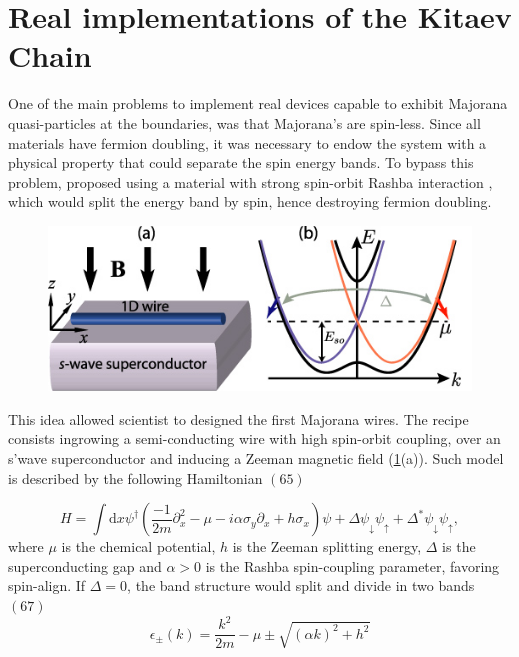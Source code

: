 % 
% 
\section{Real implementations of the Kitaev Chain \label{sec:exp}} 

 One of the main problems to implement real devices capable to exhibit Majorana quasi-particles at the boundaries, was that Majorana's are spin-less. Since all materials have fermion doubling,  it was necessary to endow the system with a physical property that could separate the spin energy bands. To bypass this problem, \citeauthor{lutchyn_majorana_2010}  proposed using a material with strong spin-orbit Rashba interaction \cite{manchon_new_2015}, which would split the energy band by spin, hence destroying fermion doubling. 

\begin{figure}[t]
\centering
\includegraphics[scale=0.7]{IMAGES/Majorana/Mwire.png}
\caption{ \label{fig:spin-orbit} \protect{}}
\end{figure}


This idea allowed scientist to designed the first Majorana wires. The recipe consists ingrowing a semi-conducting wire with high spin-orbit coupling, over an s'wave superconductor and inducing a Zeeman magnetic field (\ref{fig:spin-orbit}(a)). Such model is described by the following Hamiltonian \cite{alicea_new_2012}$(65)$

\begin{equation}
    H =\int\mbox{d}x\psi^{\dagger}\left(\frac{-1}{2m}\partial_x^{2}-\mu -i\alpha\sigma_{y}\partial_x+h\sigma_{x}\right)\psi+\Delta\psi_{\downarrow}\psi_{\uparrow}+\Delta^{*}\psi_{\downarrow}\psi_{\uparrow},
    \label{eq:MajoranaChainHam}
\end{equation}
\noindent where $\mu$ is the chemical potential, $h$ is the Zeeman splitting energy, $\Delta$ is the superconducting gap and $\alpha > 0$ is the Rashba spin-coupling parameter, favoring spin-align. If $\Delta =0$, the band structure would split and divide in two bands  \cite{alicea_new_2012}$(67)$
\begin{equation}
    \epsilon_\pm(k) = \frac{k^2}{2m} -\mu \pm \sqrt{(\alpha k)^2+h^2}
\end{equation}

